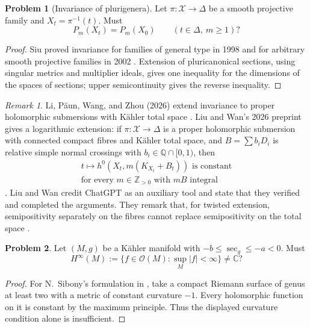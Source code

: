 \documentclass[11pt,reqno]{amsart}
\theoremstyle{definition}
\newtheorem{problem}{Problem}[section]
\theoremstyle{remark}
\newtheorem*{remark}{Remark}
\begin{document}
\begin{problem}[Invariance of plurigenera]\label{Z-plurigenera}
Let $\pi:\mathcal X\to\Delta$ be a smooth projective family and $X_t=\pi^{-1}(t)$. Must
\[
P_m(X_t)=P_m(X_0)\qquad(t\in\Delta,\ m\geq1)?
\]
\end{problem}
\begin{proof}
Siu proved invariance for families of general type in 1998 and for arbitrary smooth projective families in 2002 \cite{Z-Siu1998,Z-Siu2002}. Extension of pluricanonical sections, using singular metrics and multiplier ideals, gives one inequality for the dimensions of the spaces of sections; upper semicontinuity gives the reverse inequality.
\end{proof}
\begin{remark}
Li, P\u aun, Wang, and Zhou (2026) extend invariance to proper holomorphic submersions with K\"ahler total space \cite[Theorem~1.2]{SIU-LPWZ26}. Liu and Wan's 2026 preprint gives a logarithmic extension: if $\pi:\mathcal X\to\Delta$ is a proper holomorphic submersion with connected compact fibres and K\"ahler total space, and $B=\sum b_iD_i$ is relative simple normal crossings with $b_i\in\mathbb Q\cap[0,1)$, then
\[
\begin{gathered}
t\longmapsto h^0\!\left(X_t,m(K_{X_t}+B_t)\right)\text{ is constant}\\
\text{for every }m\in\mathbb Z_{>0}\text{ with }mB\text{ integral}
\end{gathered}
\]
\cite[Theorem~1.1]{SIU-LWPluri26}. Liu and Wan credit ChatGPT as an auxiliary tool and state that they verified and completed the arguments. They remark that, for twisted extension, semipositivity separately on the fibres cannot replace semipositivity on the total space \cite[Remark~8.5]{SIU-LWPluri26}.
\end{remark}

\begin{problem}\label{b95-11-3-1}
Let $(M,g)$ be a K\"ahler manifold with $-b\leq\sec_g\leq-a<0$. Must
\[
H^\infty(M):=\{f\in\mathcal O(M):\sup_M|f|<\infty\}\ne\mathbb C?
\]
\end{problem}
\begin{proof}
For N.~Sibony's formulation in \cite[Problem~11.3.1]{B95}, take a compact Riemann surface of genus at least two with a metric of constant curvature $-1$. Every holomorphic function on it is constant by the maximum principle. Thus the displayed curvature condition alone is insufficient.
\end{proof}
\end{document}
